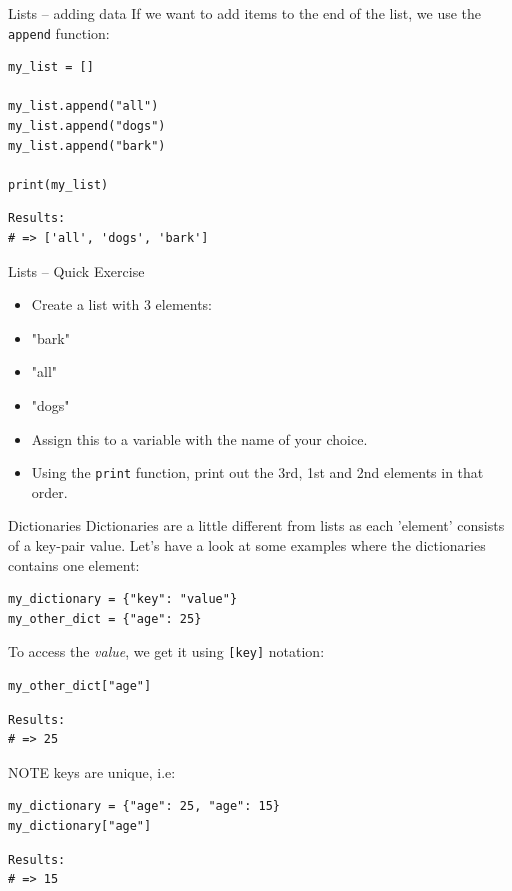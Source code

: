 \documentclass[10pt]{beamer}
\begin{document}
\begin{frame}[label={sec:org40a3c70},fragile]{Lists -- adding data}
 If we want to add items to the end of the list, we use the \texttt{append} function:

\begin{verbatim}
my_list = []

my_list.append("all")
my_list.append("dogs")
my_list.append("bark")

print(my_list)
\end{verbatim}

\begin{verbatim}
Results: 
# => ['all', 'dogs', 'bark']
\end{verbatim}
\end{frame}

\begin{frame}[label={sec:org4776156},fragile]{Lists -- Quick Exercise}
 \begin{itemize}
\item Create a list with 3 elements:

\item "bark"
\item "all"
\item "dogs"

\item Assign this to a variable with the name of your choice.
\item Using the \texttt{print} function, print out the 3rd, 1st and 2nd elements in that order.
\end{itemize}
\end{frame}

\begin{frame}[label={sec:orgff962de},fragile]{Dictionaries}
 Dictionaries are a little different from lists as each 'element' consists of a
key-pair value. Let's have a look at some examples where the dictionaries contains
\alert{one} element:

\begin{verbatim}
my_dictionary = {"key": "value"}
my_other_dict = {"age": 25}
\end{verbatim}

To access the \emph{value}, we get it using \texttt{[key]} notation:

\begin{verbatim}
my_other_dict["age"]
\end{verbatim}

\begin{verbatim}
Results: 
# => 25
\end{verbatim}


\alert{NOTE} keys are unique, i.e:

\begin{verbatim}
my_dictionary = {"age": 25, "age": 15}
my_dictionary["age"]
\end{verbatim}

\begin{verbatim}
Results: 
# => 15
\end{verbatim}
\end{frame}
\end{document}

